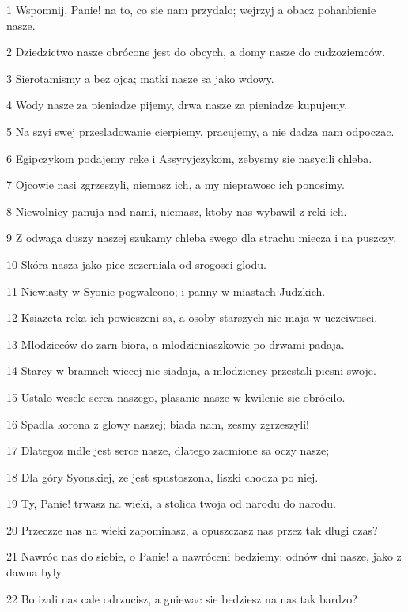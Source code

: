 \par 1 Wspomnij, Panie! na to, co sie nam przydalo; wejrzyj a obacz pohanbienie nasze.
\par 2 Dziedzictwo nasze obrócone jest do obcych, a domy nasze do cudzoziemców.
\par 3 Sierotamismy a bez ojca; matki nasze sa jako wdowy.
\par 4 Wody nasze za pieniadze pijemy, drwa nasze za pieniadze kupujemy.
\par 5 Na szyi swej przesladowanie cierpiemy, pracujemy, a nie dadza nam odpoczac.
\par 6 Egipczykom podajemy reke i Assyryjczykom, zebysmy sie nasycili chleba.
\par 7 Ojcowie nasi zgrzeszyli, niemasz ich, a my nieprawosc ich ponosimy.
\par 8 Niewolnicy panuja nad nami, niemasz, ktoby nas wybawil z reki ich.
\par 9 Z odwaga duszy naszej szukamy chleba swego dla strachu miecza i na puszczy.
\par 10 Skóra nasza jako piec zczerniala od srogosci glodu.
\par 11 Niewiasty w Syonie pogwalcono; i panny w miastach Judzkich.
\par 12 Ksiazeta reka ich powieszeni sa, a osoby starszych nie maja w uczciwosci.
\par 13 Mlodzieców do zarn biora, a mlodzieniaszkowie po drwami padaja.
\par 14 Starcy w bramach wiecej nie siadaja, a mlodziency przestali piesni swoje.
\par 15 Ustalo wesele serca naszego, plasanie nasze w kwilenie sie obrócilo.
\par 16 Spadla korona z glowy naszej; biada nam, zesmy zgrzeszyli!
\par 17 Dlategoz mdle jest serce nasze, dlatego zacmione sa oczy nasze;
\par 18 Dla góry Syonskiej, ze jest spustoszona, liszki chodza po niej.
\par 19 Ty, Panie! trwasz na wieki, a stolica twoja od narodu do narodu.
\par 20 Przeczze nas na wieki zapominasz, a opuszczasz nas przez tak dlugi czas?
\par 21 Nawróc nas do siebie, o Panie! a nawróceni bedziemy; odnów dni nasze, jako z dawna byly.
\par 22 Bo izali nas cale odrzucisz, a gniewac sie bedziesz na nas tak bardzo?


